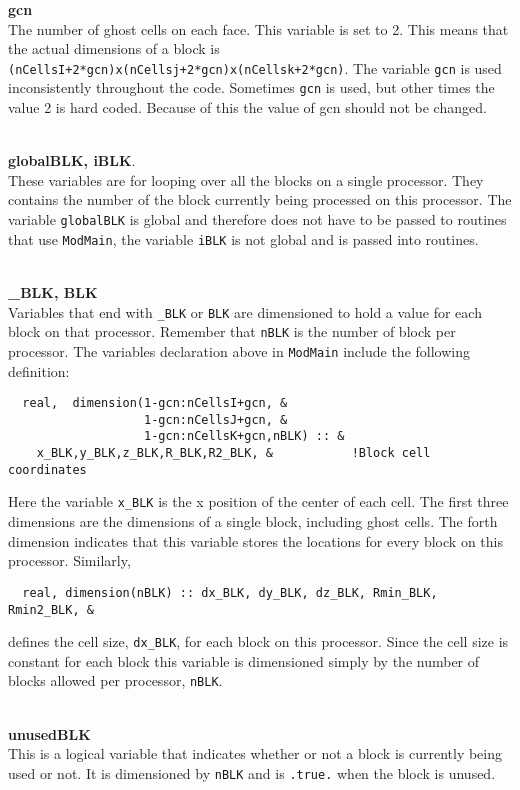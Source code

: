 \noindent
{\bf gcn} \\
The number of ghost cells on each face. This variable is set to 2.
This means that the actual dimensions of a block is 
{\tt (nCellsI+2*gcn)x(nCellsj+2*gcn)x(nCellsk+2*gcn)}.
The variable {\tt gcn} is used inconsistently throughout the code. 
Sometimes {\tt gcn} is used, but other times the value 2 is hard coded.
Because of this the value of gcn should not be changed.
 
\ \ \\
{\bf globalBLK, iBLK}.  \\
These variables are for looping over all the blocks on a 
single processor.  They contains the number of the block currently being processed 
on this processor.  The variable {\tt globalBLK} is global and therefore
does not have to be passed to routines that use {\tt ModMain}, the variable 
{\tt iBLK} is not global and is passed into routines.

\ \ \\
{\bf \_BLK, BLK} \\
Variables that end with {\tt \_BLK} or {\tt BLK} are dimensioned to hold
a value for each block on that processor.  Remember that {\tt nBLK} is the
number of block per processor.  The variables declaration above
in {\tt ModMain} include the following definition:
\begin{verbatim}
  real,  dimension(1-gcn:nCellsI+gcn, &
                   1-gcn:nCellsJ+gcn, &
                   1-gcn:nCellsK+gcn,nBLK) :: &
    x_BLK,y_BLK,z_BLK,R_BLK,R2_BLK, &           !Block cell coordinates
\end{verbatim}
Here the variable {\tt x\_BLK} is the x position of the center of each cell.
The first three dimensions are the dimensions of a single block, including
ghost cells.  The forth dimension indicates that this variable stores the
locations for every block on this processor.  Similarly,
\begin{verbatim}  
  real, dimension(nBLK) :: dx_BLK, dy_BLK, dz_BLK, Rmin_BLK, Rmin2_BLK, &
\end{verbatim}
defines the cell size, {\tt dx\_BLK}, for each block on this processor.  Since
the cell size is constant for each block this variable is dimensioned 
simply by the number of blocks allowed per processor, {\tt nBLK}.

\ \ \\
{\bf unusedBLK} \\
This is a logical variable that indicates whether or not a block is
currently being used or not.  It is dimensioned by {\tt nBLK} and is
{\tt .true.} when the block is unused.

